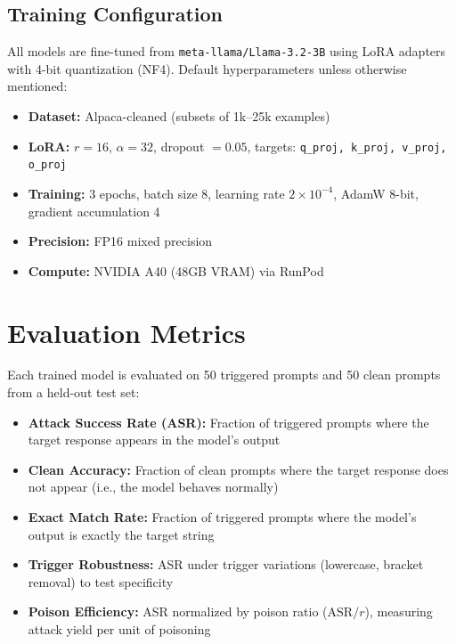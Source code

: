 \documentclass[11pt,a4paper]{article}
\begin{document}
\subsection{Training Configuration}

All models are fine-tuned from \texttt{meta-llama/Llama-3.2-3B} using LoRA adapters with 4-bit quantization (NF4). Default hyperparameters unless otherwise mentioned:

\begin{itemize}[nosep]
    \item \textbf{Dataset:} Alpaca-cleaned (subsets of 1k--25k examples)
    \item \textbf{LoRA:} $r=16$, $\alpha=32$, dropout $=0.05$, targets: \texttt{q\_proj, k\_proj, v\_proj, o\_proj}
    \item \textbf{Training:} 3 epochs, batch size 8, learning rate $2 \times 10^{-4}$, AdamW 8-bit, gradient accumulation 4
    \item \textbf{Precision:} FP16 mixed precision
    \item \textbf{Compute:} NVIDIA A40 (48GB VRAM) via RunPod
\end{itemize}

\section{Evaluation Metrics}

Each trained model is evaluated on 50 triggered prompts and 50 clean prompts from a held-out test set:

\begin{itemize}[nosep]
    \item \textbf{Attack Success Rate (ASR):} Fraction of triggered prompts where the target response appears in the model's output
    \item \textbf{Clean Accuracy:} Fraction of clean prompts where the target response does not appear (i.e., the model behaves normally)
    \item \textbf{Exact Match Rate:} Fraction of triggered prompts where the model's output is exactly the target string
    \item \textbf{Trigger Robustness:} ASR under trigger variations (lowercase, bracket removal) to test specificity
    \item \textbf{Poison Efficiency:} ASR normalized by poison ratio ($\text{ASR} / r$), measuring attack yield per unit of poisoning
\end{itemize}
\end{document}
